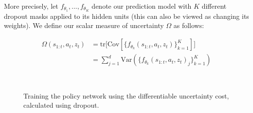 \documentclass{article} %
\begin{document}
    More precisely, let $f_{\theta_1}, ..., f_{\theta_K}$ denote our prediction model with $K$ different dropout masks applied to its hidden units (this can also be viewed as changing its weights). We define our scalar measure of uncertainty $\Omega$ as follows:



    \begin{align*}
      \Omega(s_{1:t}, a_t, z_t) &= \mbox{tr} \Big[ \mbox{Cov} [\{ f_{\theta_k}(s_{1:t}, a_t, z_t) \}_{k=1}^K] \Big] \\
      &= \sum_{j=1}^d \mbox{Var}(\{ f_{\theta_k}(s_{1:t}, a_t, z_t)_j \}_{k=1}^K)
    \end{align*}



\begin{figure}[t!]
    \centering
     \\
    \label{planning-methods}
    \caption{Training the policy network using the differentiable uncertainty cost, calculated using dropout.}
\end{figure}
\end{document}
